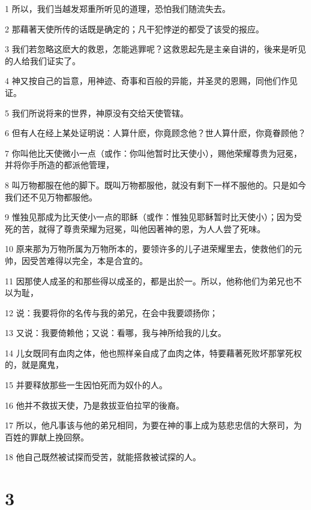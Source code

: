 \par 1 所以，我们当越发郑重所听见的道理，恐怕我们随流失去。
\par 2 那藉著天使所传的话既是确定的；凡干犯悖逆的都受了该受的报应。
\par 3 我们若忽略这麽大的救恩，怎能逃罪呢？这救恩起先是主亲自讲的，後来是听见的人给我们证实了。
\par 4 神又按自己的旨意，用神迹、奇事和百般的异能，并圣灵的恩赐，同他们作见证。
\par 5 我们所说将来的世界，神原没有交给天使管辖。
\par 6 但有人在经上某处证明说：人算什麽，你竟顾念他？世人算什麽，你竟眷顾他？
\par 7 你叫他比天使微小一点（或作：你叫他暂时比天使小），赐他荣耀尊贵为冠冕，并将你手所造的都派他管理，
\par 8 叫万物都服在他的脚下。既叫万物都服他，就没有剩下一样不服他的。只是如今我们还不见万物都服他。
\par 9 惟独见那成为比天使小一点的耶稣（或作：惟独见耶稣暂时比天使小）；因为受死的苦，就得了尊贵荣耀为冠冕，叫他因著神的恩，为人人尝了死味。
\par 10 原来那为万物所属为万物所本的，要领许多的儿子进荣耀里去，使救他们的元帅，因受苦难得以完全，本是合宜的。
\par 11 因那使人成圣的和那些得以成圣的，都是出於一。所以，他称他们为弟兄也不以为耻，
\par 12 说：我要将你的名传与我的弟兄，在会中我要颂扬你；
\par 13 又说：我要倚赖他；又说：看哪，我与神所给我的儿女。
\par 14 儿女既同有血肉之体，他也照样亲自成了血肉之体，特要藉著死败坏那掌死权的，就是魔鬼，
\par 15 并要释放那些一生因怕死而为奴仆的人。
\par 16 他并不救拔天使，乃是救拔亚伯拉罕的後裔。
\par 17 所以，他凡事该与他的弟兄相同，为要在神的事上成为慈悲忠信的大祭司，为百姓的罪献上挽回祭。
\par 18 他自己既然被试探而受苦，就能搭救被试探的人。

\chapter{3}


